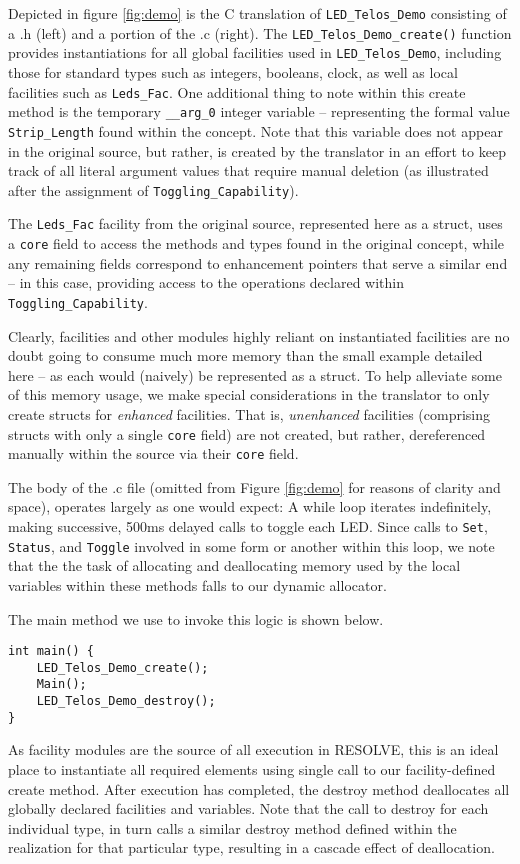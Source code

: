 Depicted in figure \ref{fig:demo} is the C translation of \texttt{LED\_Telos\_Demo} consisting of a .h (left) and a portion of the .c (right). The \texttt{LED\_Telos\_Demo\_create()} function provides instantiations for all global facilities used in \texttt{LED\_Telos\_Demo}, including those for standard types such as integers, booleans, clock, as well as local facilities such as \texttt{Leds\_Fac}. One additional thing to note within this create method is the temporary \texttt{\_\_arg\_0} integer variable -- representing the formal value \texttt{Strip\_Length} found within the concept. Note that this variable does not appear in the original source, but rather, is created by the translator in an effort to keep track of all literal argument values that require manual deletion (as illustrated after the assignment of \texttt{Toggling\_Capability}).

The \texttt{Leds\_Fac} facility from the original source, represented here as a struct, uses a \texttt{core} field to access the methods and types found in the original concept, while any remaining fields correspond to enhancement pointers that serve a similar end -- in this case, providing access to the operations declared within  \texttt{Toggling\_Capability}.

Clearly, facilities and other modules highly reliant on instantiated facilities are no doubt going to consume much more memory than the small example detailed here -- as each would (naively) be represented as a struct. To help alleviate some of this memory usage, we make special considerations in the translator to only create structs for \textit{enhanced} facilities. That is, \textit{unenhanced} facilities (comprising structs with only a single \texttt{core} field) are not created, but rather, dereferenced manually within the source via their \texttt{core} field.

The body of the .c file (omitted from Figure \ref{fig:demo} for reasons of clarity and space), operates largely as one would expect: A while loop iterates indefinitely, making successive, 500ms delayed calls to toggle each LED. Since calls to \texttt{Set}, \texttt{Status}, and \texttt{Toggle} involved in some form or another within this loop, we note that the the task of allocating and deallocating memory used by the local variables within these methods falls to our dynamic allocator.

The main method we use to invoke this logic is shown below. 

\begin{verbatim}
int main() {
    LED_Telos_Demo_create();
    Main();
    LED_Telos_Demo_destroy();
}
\end{verbatim}As facility modules are the source of all execution in RESOLVE, this is an ideal place to instantiate all required elements using single call to our facility-defined create method. After execution has completed, the destroy method deallocates all globally declared facilities and variables. Note that the call to destroy for each individual type, in turn calls a similar destroy method defined within the realization for that particular type, resulting in a cascade effect of deallocation.

